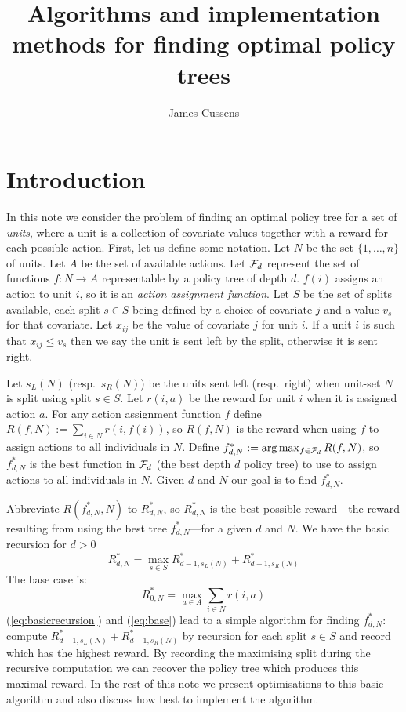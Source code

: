 \documentclass{article}
\title{Algorithms and implementation methods for finding optimal policy trees}
\author{James Cussens}
\begin{document}
\maketitle

\section{Introduction}
\label{sec:intro}

In this note we consider the problem of finding an optimal policy tree
for a set of \emph{units}, where a unit is a collection of covariate
values together with a reward for each possible action. First, let us
define some notation.  Let $N$ be the set $\{1,\dots,n\}$ of
units. Let $A$ be the set of available actions.  Let ${\cal F}_d$
represent the set of functions $f:N \rightarrow A$ representable by a
policy tree of depth $d$. $f(i)$ assigns an action to unit $i$, so it
is an \emph{action assignment function}. Let $S$ be the set of splits
available, each split $s \in S$ being defined by a choice of covariate
$j$ and a value $v_s$ for that covariate. Let $x_{ij}$ be the value of
covariate $j$ for unit $i$. If a unit $i$ is such that
$x_{ij} \leq v_{s}$ then we say the unit is sent left by the split,
otherwise it is sent right.

Let $s_{L}(N)$ (resp.\ $s_{R}(N)$) be the units sent left (resp.\
right) when unit-set $N$ is split using split $s \in S$. Let $r(i,a)$
be the reward for unit $i$ when it is assigned action $a$. For any
action assignment function $f$ define
$R(f,N) := \sum_{i \in N} r(i,f(i))$, so $R(f,N)$ is the reward when
using $f$ to assign actions to all individuals in $N$. Define
$f^{*}_{d,N} := \arg\max_{f \in {\cal F}_d} R(f,N)$, so $f^{*}_{d,N}$
is the best function in ${\cal F}_d$ (the best depth $d$ policy tree)
to use to assign actions to all individuals in $N$. Given $d$ and $N$
our goal is to find $f^{*}_{d,N}$.

Abbreviate $R(f^{*}_{d,N},N)$ to $R^{*}_{d,N}$, so $R^{*}_{d,N}$ is the best
possible reward---the reward resulting from using the best tree
$f^{*}_{d,N}$---for a given $d$ and $N$. We have the basic recursion
for $d>0$
\begin{equation}
  \label{eq:basicrecursion}
  R^{*}_{d,N}
  = \max_{s \in S}   R^{*}_{d-1,s_{L}(N)} + R^{*}_{d-1,s_{R}(N)} 
\end{equation}
The base case is:
\begin{equation}
  \label{eq:base}
    R^{*}_{0,N} =  \max_{a \in A} \sum_{i \in N}  r(i,a)
\end{equation}
(\ref{eq:basicrecursion}) and (\ref{eq:base}) lead to a simple
algorithm for finding $f^{*}_{d,N}$: compute $R^{*}_{d-1,s_{L}(N)} +
R^{*}_{d-1,s_{R}(N)}$ by recursion for each split $s \in S$ and record
which has the highest reward. By recording the maximising
split during the recursive computation we can recover the policy tree
which produces this maximal reward. In the rest of this note we
present optimisations to this basic algorithm and also discuss how
best to implement the algorithm.
\end{document}
